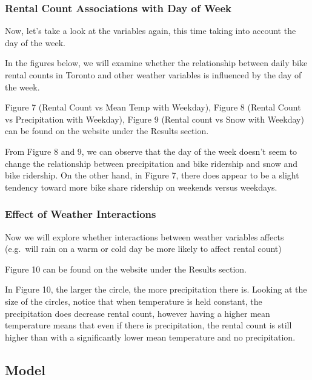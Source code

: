 \documentclass[
]{article}
\begin{document}
\hypertarget{rental-count-associations-with-day-of-week}{%
\subsubsection{Rental Count Associations with Day of
Week}\label{rental-count-associations-with-day-of-week}}

Now, let's take a look at the variables again, this time taking into
account the day of the week.

In the figures below, we will examine whether the relationship between
daily bike rental counts in Toronto and other weather variables is
influenced by the day of the week.

Figure 7 (Rental Count vs Mean Temp with Weekday), Figure 8 (Rental
Count vs Precipitation with Weekday), Figure 9 (Rental count vs Snow
with Weekday) can be found on the website under the Results section.

From Figure 8 and 9, we can observe that the day of the week doesn't
seem to change the relationship between precipitation and bike ridership
and snow and bike ridership. On the other hand, in Figure 7, there does
appear to be a slight tendency toward more bike share ridership on
weekends versus weekdays.

\hypertarget{effect-of-weather-interactions}{%
\subsubsection{Effect of Weather
Interactions}\label{effect-of-weather-interactions}}

Now we will explore whether interactions between weather variables
affects (e.g.~will rain on a warm or cold day be more likely to affect
rental count)

Figure 10 can be found on the website under the Results section.

In Figure 10, the larger the circle, the more precipitation there is.
Looking at the size of the circles, notice that when temperature is held
constant, the precipitation does decrease rental count, however having a
higher mean temperature means that even if there is precipitation, the
rental count is still higher than with a significantly lower mean
temperature and no precipitation.

\hypertarget{model}{%
\subsection{Model}\label{model}}
\end{document}
